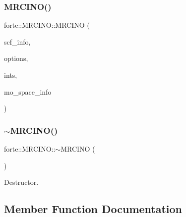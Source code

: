 \subsubsection{\texorpdfstring{M\+R\+C\+I\+N\+O()}{MRCINO()}}
{\footnotesize\ttfamily forte\+::\+M\+R\+C\+I\+N\+O\+::\+M\+R\+C\+I\+NO (\begin{DoxyParamCaption}\item[{std\+::shared\+\_\+ptr$<$ \mbox{\hyperlink{classforte_1_1_s_c_f_info}{S\+C\+F\+Info}} $>$}]{scf\+\_\+info,  }\item[{std\+::shared\+\_\+ptr$<$ \mbox{\hyperlink{classforte_1_1_forte_options}{Forte\+Options}} $>$}]{options,  }\item[{std\+::shared\+\_\+ptr$<$ \mbox{\hyperlink{classforte_1_1_forte_integrals}{Forte\+Integrals}} $>$}]{ints,  }\item[{std\+::shared\+\_\+ptr$<$ \mbox{\hyperlink{classforte_1_1_m_o_space_info}{M\+O\+Space\+Info}} $>$}]{mo\+\_\+space\+\_\+info }\end{DoxyParamCaption})}

\mbox{\label{classforte_1_1_m_r_c_i_n_o_a164cef53988921f9c4bec1da4a46b5d9}} 
\subsubsection{\texorpdfstring{$\sim$\+M\+R\+C\+I\+N\+O()}{~MRCINO()}}
{\footnotesize\ttfamily forte\+::\+M\+R\+C\+I\+N\+O\+::$\sim$\+M\+R\+C\+I\+NO (\begin{DoxyParamCaption}{ }\end{DoxyParamCaption})}



Destructor. 



\subsection{Member Function Documentation}
\mbox{\label{classforte_1_1_m_r_c_i_n_o_a0011f9c5bf52e26c96c3283beca3355a}} 
